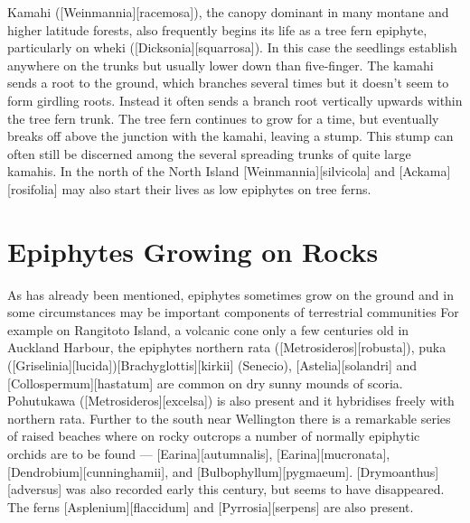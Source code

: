 Kamahi ([Weinmannia][racemosa]), the canopy dominant in many montane and higher latitude forests, also frequently begins its life as a tree fern epiphyte, particularly on wheki ([Dicksonia][squarrosa]).
In this case the seedlings establish anywhere on the trunks but usually lower down than five-finger.
The kamahi sends a root to the ground, which branches several times but it doesn't seem to form girdling roots.
Instead it often sends a branch root vertically upwards within the tree fern trunk.
The tree fern continues to grow for a time, but eventually breaks off above the junction with the kamahi, leaving a stump.
This stump can often still be discerned among the several spreading trunks of quite large kamahis.
In the north of the North Island [Weinmannia][silvicola] and [Ackama][rosifolia] may also start their lives as low epiphytes on tree ferns.

\section{Epiphytes Growing on Rocks}

As has already been mentioned, epiphytes sometimes grow on the ground and in some circumstances may be important components of terrestrial communities For example on Rangitoto Island, a volcanic cone only a few centuries old in Auckland Harbour, the epiphytes northern rata ([Metrosideros][robusta]), puka ([Griselinia][lucida])[Brachyglottis][kirkii] (Senecio),  [Astelia][solandri] and [Collospermum][hastatum] are common on dry sunny mounds of scoria.
Pohutukawa ([Metrosideros][excelsa]) is also present and it hybridises freely with northern rata.
Further to the south near Wellington there is a remarkable series of raised beaches where on rocky outcrops a number of normally epiphytic orchids are to be found --- [Earina][autumnalis], [Earina][mucronata], [Dendrobium][cunninghamii], and [Bulbophyllum][pygmaeum]. [Drymoanthus][adversus] was also recorded early this century, but seems to have disappeared.
The ferns [Asplenium][flaccidum] and [Pyrrosia][serpens] are also present.

